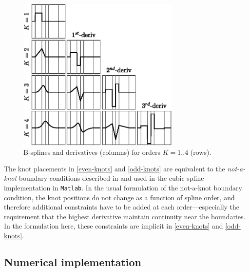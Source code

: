 \documentclass{ametsoc}
\begin{document}
\begin{figure}
  \centerline{\includegraphics[width=19pc,angle=0]{bsplines.eps}}
  \caption{B-splines and derivatives (columns) for orders $K=1..4$ (rows).}
  \label{bsplines}
\end{figure}

The knot placements in \eqref{even-knots} and \eqref{odd-knots} are equivalent to the \textit{not-a-knot} boundary conditions described in \citet{deboor1978-book} and used in the cubic spline implementation in \texttt{Matlab}. In the usual formulation of the not-a-knot boundary condition, the knot positions do not change as a function of spline order, and therefore additional constraints have to be added at each order---especially the requirement that the highest derivative maintain continuity near the boundaries. In the formulation here, these constraints are implicit in  \eqref{even-knots} and \eqref{odd-knots}.


\subsection{Numerical implementation}
\end{document}
